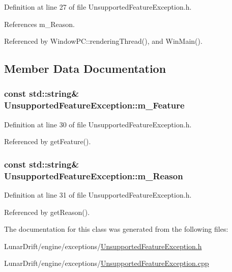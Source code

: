 Definition at line 27 of file Unsupported\+Feature\+Exception.\+h.



References m\+\_\+\+Reason.



Referenced by Window\+P\+C\+::rendering\+Thread(), and Win\+Main().



\subsection{Member Data Documentation}
\subsubsection[{\texorpdfstring{m\+\_\+\+Feature}{m_Feature}}]{\setlength{\rightskip}{0pt plus 5cm}const std\+::string\& Unsupported\+Feature\+Exception\+::m\+\_\+\+Feature\hspace{0.3cm}{\ttfamily [private]}}\hypertarget{class_unsupported_feature_exception_a517eaef16c6ed4468d71121cd6ea37d3}{}\label{class_unsupported_feature_exception_a517eaef16c6ed4468d71121cd6ea37d3}


Definition at line 30 of file Unsupported\+Feature\+Exception.\+h.



Referenced by get\+Feature().

\subsubsection[{\texorpdfstring{m\+\_\+\+Reason}{m_Reason}}]{\setlength{\rightskip}{0pt plus 5cm}const std\+::string\& Unsupported\+Feature\+Exception\+::m\+\_\+\+Reason\hspace{0.3cm}{\ttfamily [private]}}\hypertarget{class_unsupported_feature_exception_a0d435f85891b5aea836729f196088ccf}{}\label{class_unsupported_feature_exception_a0d435f85891b5aea836729f196088ccf}


Definition at line 31 of file Unsupported\+Feature\+Exception.\+h.



Referenced by get\+Reason().



The documentation for this class was generated from the following files\+:\begin{DoxyCompactItemize}
\item 
Lunar\+Drift/engine/exceptions/\hyperlink{_unsupported_feature_exception_8h}{Unsupported\+Feature\+Exception.\+h}\item 
Lunar\+Drift/engine/exceptions/\hyperlink{_unsupported_feature_exception_8cpp}{Unsupported\+Feature\+Exception.\+cpp}\end{DoxyCompactItemize}
